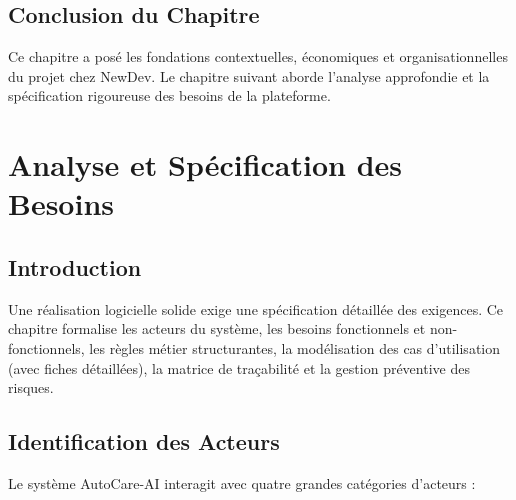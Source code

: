 \documentclass[12pt,a4paper,oneside]{report}
\begin{document}
\section{Conclusion du Chapitre}
Ce chapitre a pos\'e les fondations contextuelles, \'economiques et organisationnelles du projet chez NewDev. Le chapitre suivant aborde l'analyse approfondie et la sp\'ecification rigoureuse des besoins de la plateforme.

\clearpage
\chapter{Analyse et Sp\'ecification des Besoins}

\section{Introduction}
Une r\'ealisation logicielle solide exige une sp\'ecification d\'etaill\'ee des exigences. Ce chapitre formalise les acteurs du syst\`eme, les besoins fonctionnels et non-fonctionnels, les r\`egles m\'etier structurantes, la mod\'elisation des cas d'utilisation (avec fiches d\'etaill\'ees), la matrice de tra\c{c}abilit\'e et la gestion pr\'eventive des risques.

\section{Identification des Acteurs}
Le syst\`eme AutoCare-AI interagit avec quatre grandes cat\'egories d'acteurs :
\end{document}
